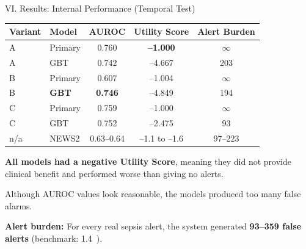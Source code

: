 \begin{frame}{VI. Results: Internal Performance (Temporal Test)}
\begin{center}\tablestyle\footnotesize
\begin{tabular}{llccc}
\toprule
\textbf{Variant} & \textbf{Model} & \textbf{AUROC}
  & \textbf{Utility Score} & \textbf{Alert Burden} \\
\midrule
A   & Primary      & 0.760          & \textbf{--1.000} & $\infty$ \\
A   & GBT          & 0.742          & --4.667          & 203 \\
B   & Primary      & 0.607          & --1.004          & $\infty$ \\
B   & \textbf{GBT} & \textbf{0.746} & --4.849          & 194 \\
C   & Primary      & 0.759          & --1.000          & $\infty$ \\
C   & GBT          & 0.752          & --2.475          & 93 \\
n/a & NEWS2        & 0.63--0.64     & --1.1 to --1.6   & 97--223 \\
\bottomrule
\end{tabular}
\end{center}

\vspace{2pt}
{\small\textbf{All models had a negative Utility Score}, meaning they did not
provide clinical benefit and performed worse than giving no alerts.\par}

\vspace{2pt}
{\small Although AUROC values look reasonable, the models produced too many
false alarms.\par}

\vspace{2pt}
{\small\textbf{Alert burden:} For every real sepsis alert, the system generated
\textbf{93--359 false alerts} (benchmark: 1.4~\cite{moor2023review}).\par}
\end{frame}



